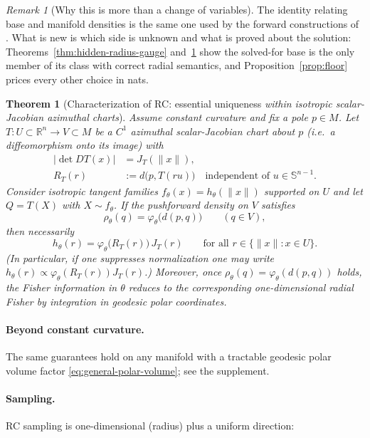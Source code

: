 \documentclass{article}
\newtheorem{theorem}{Theorem}
\theoremstyle{definition}
\theoremstyle{remark}
\newtheorem{remark}{Remark}
\newcommand{\SSS}{\mathbb{S}}
\begin{document}
\begin{remark}[Why this is more than a change of variables]
\label{rem:not-cov}
The identity relating base and manifold densities is the same one used by the forward constructions of \citet{nagano2019wrapped,skopek2019mixed}. What is new is which side is unknown and what is proved about the solution: Theorems~\ref{thm:hidden-radius-gauge} and~\ref{thm:rc_uniqueness} show the solved-for base is the only member of its class with correct radial semantics, and Proposition~\ref{prop:floor} prices every other choice in nats.
\end{remark}

\begin{theorem}[Characterization of RC: essential uniqueness \emph{within isotropic scalar-Jacobian azimuthal charts}]
\label{thm:rc_uniqueness}
Assume constant curvature and fix a pole $p\in M$.
Let $T:U\subset\mathbb{R}^n\to V\subset M$ be a $C^1$ \emph{azimuthal scalar-Jacobian chart}
about $p$ (i.e.\ a diffeomorphism onto its image) with
\[
\begin{aligned}
|\det DT(x)| &= J_T(\|x\|),\\
R_T(r) &:= d\!\bigl(p,T(ru)\bigr)\quad \text{independent of }u\in \SSS^{n-1}.
\end{aligned}
\]
Consider isotropic tangent families $f_\theta(x)=h_\theta(\|x\|)$ supported on $U$ and let
$Q=T(X)$ with $X\sim f_\theta$. If the pushforward density on $V$ satisfies
\[
\rho_\theta(q)=\varphi_\theta\!\bigl(d(p,q)\bigr)\qquad (q\in V),
\]
then necessarily
\[
h_\theta(r)=\varphi_\theta\!\bigl(R_T(r)\bigr)\,J_T(r)\qquad
\text{for all } r\in\{\|x\|:x\in U\}.
\]
(In particular, if one suppresses normalization one may write
$h_\theta(r)\propto \varphi_\theta(R_T(r))J_T(r)$.)
Moreover, once $\rho_\theta(q)=\varphi_\theta(d(p,q))$ holds, the Fisher information in $\theta$
reduces to the corresponding one-dimensional radial Fisher by integration in geodesic polar
coordinates.
\end{theorem}
\paragraph{Beyond constant curvature.}
The same guarantees hold on any manifold with a tractable geodesic polar volume factor \eqref{eq:general-polar-volume}; see the supplement.

\paragraph{Sampling.}
RC sampling is one-dimensional (radius) plus a uniform direction:
\end{document}
